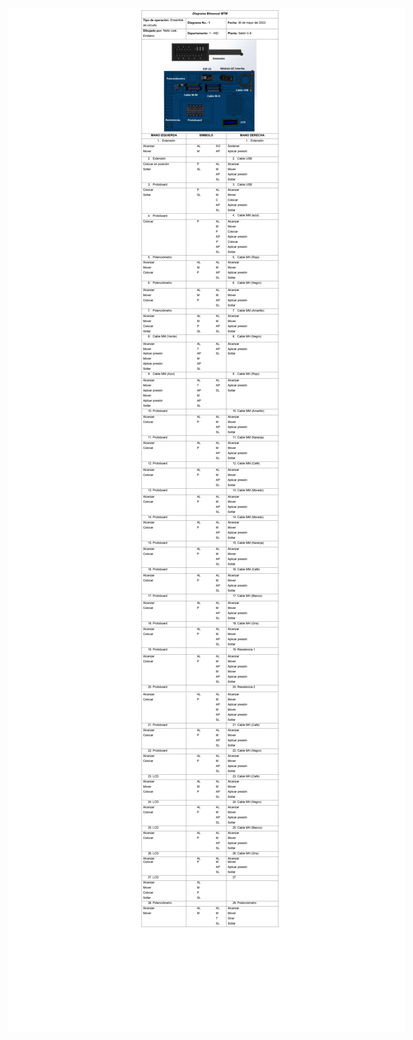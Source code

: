     \begin{figure}[H]
        \centering
        \includegraphics[trim = {260mm 1359mm 250mm 0mm},clip,scale=0.25]{19/Img/diagramaBimanual2.pdf}
        \newpage
        \label{fig:diagramaBimanual21}    
    \end{figure}
